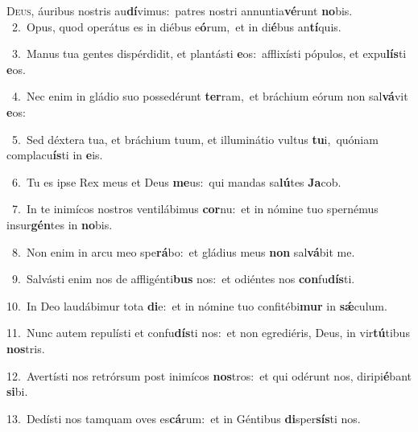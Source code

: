 \lettrine{\initial\textcolor{\initialcolor}{D}}{eus,} áuribus nostris au\-\textbf{dí}\-vimus:~\star patres nostri annuntia\-\textbf{vé}\-runt \textbf{no}\-bis.\\
{\numbfont\textcolor{\numbcolor}{~2.}}~Opus, quod operátus es in diébus e\-\textbf{ó}\-rum,~\star et in di\-\textbf{é}\-bus an\-\textbf{tí}\-quis.\par
{\numbfont\textcolor{\numbcolor}{~3.}}~Manus tua gentes dispérdidit, et plantásti \textbf{e}\-os:~\star afflixísti pópulos, et expu\-\textbf{lís}\-ti \textbf{e}\-os.\par
{\numbfont\textcolor{\numbcolor}{~4.}}~Nec enim in gládio suo possedérunt \textbf{ter}\-ram,~\star et bráchium eórum non sal\-\textbf{vá}\-vit \textbf{e}\-os:\par
{\numbfont\textcolor{\numbcolor}{~5.}}~Sed déxtera tua, et bráchium tuum, et illuminátio vultus \textbf{tu}\-i,~\star quóniam complacu\-\textbf{ís}\-ti in \textbf{e}\-is.\par
{\numbfont\textcolor{\numbcolor}{~6.}}~Tu es ipse Rex meus et Deus \textbf{me}\-us:~\star qui mandas sa\-\textbf{lú}\-tes \textbf{Ja}\-cob.\par
{\numbfont\textcolor{\numbcolor}{~7.}}~In te inimícos nostros ventilábimus \textbf{cor}\-nu:~\star et in nómine tuo spernémus insur\-\textbf{gén}\-tes in \textbf{no}\-bis.\par
{\numbfont\textcolor{\numbcolor}{~8.}}~Non enim in arcu meo spe\-\textbf{rá}\-bo:~\star et gládius meus \textbf{non} sal\-\textbf{vá}\-bit me.\par
{\numbfont\textcolor{\numbcolor}{~9.}}~Salvásti enim nos de affligénti\textbf{bus} nos:~\star et odiéntes nos \textbf{con}\-fu\-\textbf{dís}\-ti.\par
{\numbfont\textcolor{\numbcolor}{10.}}~In Deo laudábimur tota \textbf{di}\-e:~\star et in nómine tuo confitébi\textbf{mur} in \textbf{sǽ}\-culum.\par
{\numbfont\textcolor{\numbcolor}{11.}}~Nunc autem repulísti et confu\-\textbf{dís}\-ti nos:~\star et non egrediéris, Deus, in vir\-\textbf{tú}\-tibus \textbf{nos}\-tris.\par
{\numbfont\textcolor{\numbcolor}{12.}}~Avertísti nos retrórsum post inimícos \textbf{nos}\-tros:~\star et qui odérunt nos, diripi\-\textbf{é}\-bant \textbf{si}\-bi.\par
{\numbfont\textcolor{\numbcolor}{13.}}~Dedísti nos tamquam oves es\-\textbf{cá}\-rum:~\star et in Géntibus \textbf{di}\-sper\-\textbf{sís}\-ti nos.\par
